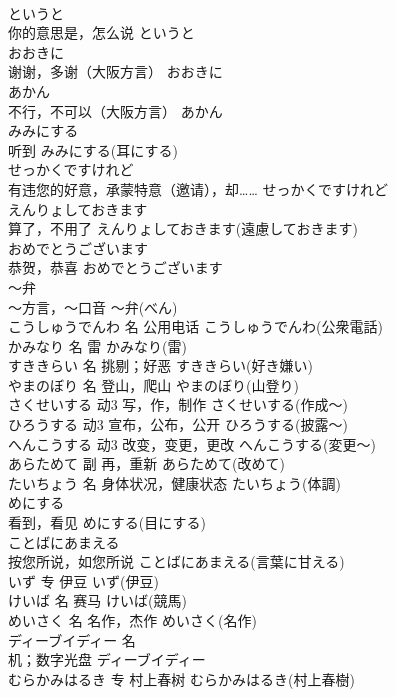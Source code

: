 \documentclass[8pt]{extreport}
\begin{document}
\begin{CJK}{UTF8}{min}
\\	というと	
\\	你的意思是，怎么说	というと	
\\	おおきに	
\\	谢谢，多谢（大阪方言）	おおきに	
\\	あかん	
\\	不行，不可以（大阪方言）	あかん	
\\	みみにする	
\\	听到	みみにする(耳にする)	
\\	せっかくですけれど	
\\	有违您的好意，承蒙特意（邀请），却……	せっかくですけれど	
\\	えんりょしておきます	
\\	算了，不用了	えんりょしておきます(遠慮しておきます)	
\\	おめでとうございます	
\\	恭贺，恭喜	おめでとうございます	
\\	～弁	
\\	～方言，～口音	～弁(べん)	
\\	こうしゅうでんわ	名	公用电话	こうしゅうでんわ(公衆電話)	
\\	かみなり	名	雷	かみなり(雷)	
\\	すききらい	名	挑剔；好恶	すききらい(好き嫌い)	
\\	やまのぼり	名	登山，爬山	やまのぼり(山登り)	
\\	さくせいする	动3	写，作，制作	さくせいする(作成～)	
\\	ひろうする	动3	宣布，公布，公开	ひろうする(披露～)	
\\	へんこうする	动3	改变，变更，更改	へんこうする(変更～)	
\\	あらためて	副	再，重新	あらためて(改めて)	
\\	たいちょう	名	身体状况，健康状态	たいちょう(体調)	
\\	めにする	
\\	看到，看见	めにする(目にする)	
\\	ことばにあまえる	
\\	按您所说，如您所说	ことばにあまえる(言葉に甘える)	
\\	いず	专	伊豆	いず(伊豆)	
\\	けいば	名	赛马	けいば(競馬)	
\\	めいさく	名	名作，杰作	めいさく(名作)	
\\	ディーブイディー	名	
\\	机；数字光盘	ディーブイディー
\\	むらかみはるき	专	村上春树	むらかみはるき(村上春樹)	

\end{CJK}
\end{document}
